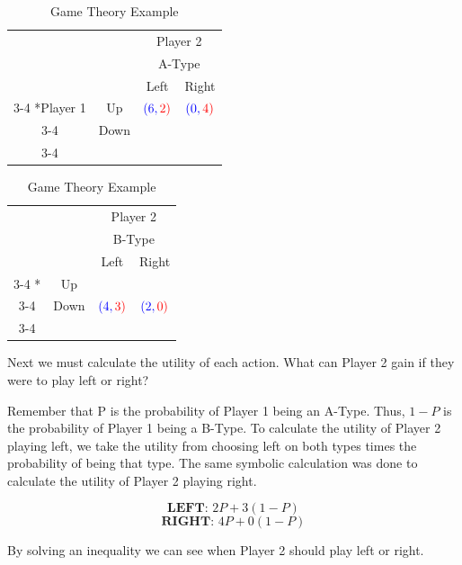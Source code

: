 \documentclass[letterpaper,12pt]{report}
\begin{document}
\begin{table}[!bt]
    \setlength{\extrarowheight}{2pt}
    \begin{tabular}{cc|c|c|}
      & \multicolumn{1}{c}{} & \multicolumn{2}{c}{\color{red}Player 2}\\
      & \multicolumn{1}{c}{} & \multicolumn{2}{c}{\color{red}A-Type}\\
      & \multicolumn{1}{c}{} & \multicolumn{1}{c}{\color{red}Left}  & \multicolumn{1}{c}{\color{red}Right} \\\cline{3-4}
      \multirow{2}*{\color{blue}Player 1}  & \color{blue}Up & $\color{blue}(6,\color{red}2)$ & $\color{blue}(0,\color{red}4)$ \\\cline{3-4}
      & \color{blue}Down &  &  \\\cline{3-4}
    \end{tabular}
    \begin{tabular}{cc|c|c|}
      & \multicolumn{1}{c}{} & \multicolumn{2}{c}{\color{red}Player 2}\\
      & \multicolumn{1}{c}{} & \multicolumn{2}{c}{\color{red}B-Type}\\
      & \multicolumn{1}{c}{} & \multicolumn{1}{c}{\color{red}Left}  & \multicolumn{1}{c}{\color{red}Right} \\\cline{3-4}
      \multirow{2}*{}  & \color{blue}Up &  &  \\\cline{3-4}
      & \color{blue}Down & $\color{blue}(4,\color{red}3)$ & $\color{blue}(2,\color{red}0)$ \\\cline{3-4}
    \end{tabular}
\caption{Game Theory Example}
\label{Tab:game_theory_2}
\end{table}

\bigskip

Next we must calculate the utility of each action. What can Player 2 gain if they were to play left or right?

Remember that P is the probability of Player 1 being an A-Type. Thus, $1-P$ is the probability of Player 1 being a B-Type. To calculate the utility of Player 2 playing left, we take the utility from choosing left on both types times the probability of being that type. The same symbolic calculation was done to calculate the utility of Player 2 playing right.

$$\textbf{LEFT: } 2P + 3(1-P)$$
$$\textbf{RIGHT: }  4P + 0(1-P)$$

By solving an inequality we can see when Player 2 should play left or right.
\end{document}
